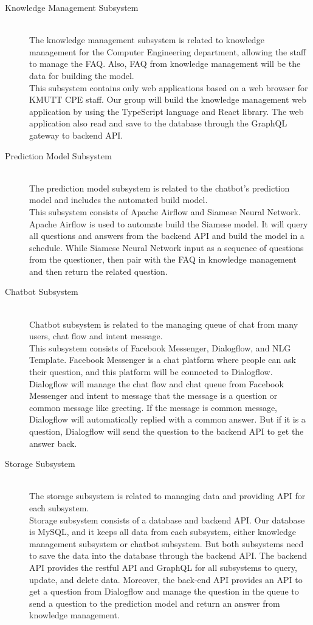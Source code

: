 \documentclass[12pt,oneside,openright,a4paper]{cpe-english-project}
\begin{document}
\begin{description}
	\item [Knowledge Management Subsystem]
	\hfill \\The knowledge management subsystem is related to knowledge management for the Computer Engineering department, allowing the staff to manage the FAQ. Also, FAQ from knowledge management will be the data for building the model.\\
	This subsystem contains only web applications based on a web browser for KMUTT CPE staff. Our group will build the knowledge management web application by using the TypeScript language and React library. The web application also read and save to the database through the GraphQL gateway to backend API.
	\item [Prediction Model Subsystem]
	\hfill \\The prediction model subsystem is related to the chatbot's prediction model and includes the automated build model.\\
	This subsystem consists of Apache Airflow and Siamese Neural Network. Apache Airflow is used to automate build the Siamese model. It will query all questions and answers from the backend API and build the model in a schedule. While Siamese Neural Network input as a sequence of questions from the questioner, then pair with the FAQ in knowledge management and then return the related question.
	\item [Chatbot Subsystem]
	\hfill \\Chatbot subsystem is related to the managing queue of chat from many users, chat flow and intent message.\\
	This subsystem consists of Facebook Messenger, Dialogflow, and NLG Template. Facebook Messenger is a chat platform where people can ask their question, and this platform will be connected to Dialogflow. Dialogflow will manage the chat flow and chat queue from Facebook Messenger and intent to message that the message is a question or common message like greeting. If the message is common message, Dialogflow will automatically replied with a common answer. But if it is a question, Dialogflow will send the question to the backend API to get the answer back.
	\item [Storage Subsystem]
	\hfill \\The storage subsystem is related to managing data and providing API for each subsystem.\\
	Storage subsystem consists of a database and backend API. Our database is MySQL, and it keeps all data from each subsystem, either knowledge management subsystem or chatbot subsystem. But both subsystems need to save the data into the database through the backend API. The backend API provides the restful API and GraphQL for all subsystems to query, update, and delete data. Moreover, the back-end API provides an API to get a question from Dialogflow and manage the question in the queue to send a question to the prediction model and return an answer from knowledge management.
\end{description}
\end{document}

